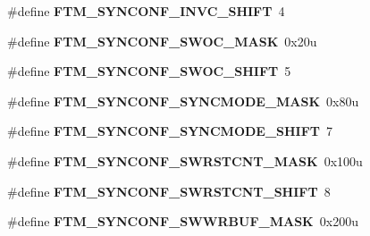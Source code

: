 \begin{DoxyCompactItemize}
\item 
\#define {\bfseries F\+T\+M\+\_\+\+S\+Y\+N\+C\+O\+N\+F\+\_\+\+I\+N\+V\+C\+\_\+\+S\+H\+I\+FT}~4\hypertarget{group__FTM__Register__Masks_ga3cd40ba39f488383a2fb0f456182fd69}{}\label{group__FTM__Register__Masks_ga3cd40ba39f488383a2fb0f456182fd69}

\item 
\#define {\bfseries F\+T\+M\+\_\+\+S\+Y\+N\+C\+O\+N\+F\+\_\+\+S\+W\+O\+C\+\_\+\+M\+A\+SK}~0x20u\hypertarget{group__FTM__Register__Masks_ga4be17e62a2b566e56f1fb8e1b6277637}{}\label{group__FTM__Register__Masks_ga4be17e62a2b566e56f1fb8e1b6277637}

\item 
\#define {\bfseries F\+T\+M\+\_\+\+S\+Y\+N\+C\+O\+N\+F\+\_\+\+S\+W\+O\+C\+\_\+\+S\+H\+I\+FT}~5\hypertarget{group__FTM__Register__Masks_ga526c746783f0693a0a3ceb20e439ca26}{}\label{group__FTM__Register__Masks_ga526c746783f0693a0a3ceb20e439ca26}

\item 
\#define {\bfseries F\+T\+M\+\_\+\+S\+Y\+N\+C\+O\+N\+F\+\_\+\+S\+Y\+N\+C\+M\+O\+D\+E\+\_\+\+M\+A\+SK}~0x80u\hypertarget{group__FTM__Register__Masks_ga89a0f9556ea7950d3e283bebb64ab41a}{}\label{group__FTM__Register__Masks_ga89a0f9556ea7950d3e283bebb64ab41a}

\item 
\#define {\bfseries F\+T\+M\+\_\+\+S\+Y\+N\+C\+O\+N\+F\+\_\+\+S\+Y\+N\+C\+M\+O\+D\+E\+\_\+\+S\+H\+I\+FT}~7\hypertarget{group__FTM__Register__Masks_gaa8a4896f4e71a168309874a5523cadfc}{}\label{group__FTM__Register__Masks_gaa8a4896f4e71a168309874a5523cadfc}

\item 
\#define {\bfseries F\+T\+M\+\_\+\+S\+Y\+N\+C\+O\+N\+F\+\_\+\+S\+W\+R\+S\+T\+C\+N\+T\+\_\+\+M\+A\+SK}~0x100u\hypertarget{group__FTM__Register__Masks_gaca64a162094a826217a4e11ddc06a818}{}\label{group__FTM__Register__Masks_gaca64a162094a826217a4e11ddc06a818}

\item 
\#define {\bfseries F\+T\+M\+\_\+\+S\+Y\+N\+C\+O\+N\+F\+\_\+\+S\+W\+R\+S\+T\+C\+N\+T\+\_\+\+S\+H\+I\+FT}~8\hypertarget{group__FTM__Register__Masks_gab661d595985aee2b904c0aeae79125c0}{}\label{group__FTM__Register__Masks_gab661d595985aee2b904c0aeae79125c0}

\item 
\#define {\bfseries F\+T\+M\+\_\+\+S\+Y\+N\+C\+O\+N\+F\+\_\+\+S\+W\+W\+R\+B\+U\+F\+\_\+\+M\+A\+SK}~0x200u\hypertarget{group__FTM__Register__Masks_ga36811ec448ab628c5157dabf3c62381e}{}\label{group__FTM__Register__Masks_ga36811ec448ab628c5157dabf3c62381e}


\end{DoxyCompactItemize}
